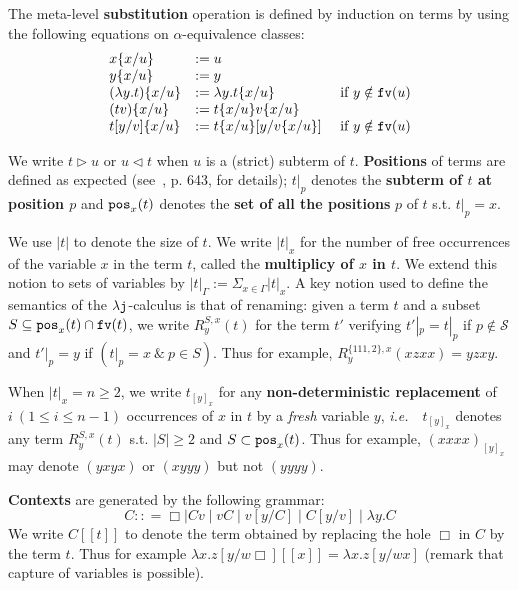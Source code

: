 \documentclass{LMCS}
\newcommand{\ie}{{\it  i.e.}~}
\renewcommand{\>}{\rightarrow}
\def\lam{\lambda}
\newcommand{\isubs}[1]{ \{ #1  \} }
\newcommand{\pos}[2]{{\tt pos}_{#1}(#2)}
\renewcommand{\S}{\mathcal{S}}
\newcommand{\dis}{{\tt j}}
\newcommand{\ldis}{\lam{\dis}}
\newcommand{\ren}[4]{R^{#2, #3}_{#4}(#1)}
\newcommand{\fv}[1]{{\tt fv}(#1)}
\newcommand{\set}[1]{ \{ #1 \}}
\newcommand{\deft}[1]{{\bf #1}}
\newcommand{\ctx}[2]{#1 [ \! [#2] \! ]}
\newcommand{\subt}{\triangleleft}
\newcommand{\surt}{\triangleright}
\newcommand{\hole}{\Box}
\begin{document}
The meta-level \deft{substitution} operation is defined by
induction on terms by using the following equations on $\alpha$-equivalence classes:
\[ \begin{array}{llll}
x \isubs{x/u} & := u \\
y \isubs{x/u} & := y \\
(\lam y. t) \isubs{x/u} & := \lam y. t \isubs{x/u} & \mbox{ if } y \notin \fv{u}   \\
(tv) \isubs{x/u} & := t \isubs{x/u}v \isubs{x/u}   \\
t[y/v] \isubs{x/u} & := t \isubs{x/u}[y/v \isubs{x/u}] & \mbox{ if } y \notin \fv{u}  \\
\end{array} \] 

We write $t \surt u$ or $u \subt t$ when $u$ is a (strict) subterm of $t$.
\deft{Positions} of terms are defined as expected (see~\cite{Terese03}, p. 643, for details);  $t|_p$ denotes
the \deft{subterm of $t$ at position $p$}
and $\pos{x}{t}$ denotes the \deft{set of all the positions} $p$ of
$t$ s.t. $t|_{p}= x$. 


We use $|t|$ to denote the size of $t$. We write $|t|_x$ for the
number of free occurrences of the variable $x$ in the term $t$,
called the \deft{multiplicy of $x$ in $t$}. We extend this notion to sets of variables by
  $|t|_{\Gamma}:= \Sigma_{x \in \Gamma} |t|_{x}$. 
A key notion used to define the semantics 
of the $\ldis$-calculus is that of renaming:
given a term $t$ and a subset
$S \subseteq \pos{x}{t} \cap \fv{t} $, we write $\ren{t}{S}{x}{y}$ for
the term $t'$ verifying $t'|_p = t|_p$ if $p \notin \S$
and $t'|_p = y$ if $(t|_p =x\ \&\ p \in S)$. Thus for example,
$\ren{x z x x}{\set{111,2}}{x}{y} = y z x y$. 

When $|t|_{x}= n
\geq 2$, we write $t_{[y]_x}$ for any
\deft{non-deterministic replacement} of $i\ ( 1 \leq i \leq n-1)$
occurrences of $x$ in $t$ by a {\it fresh} variable $y$, \ie\
$t_{[y]_x}$ denotes  any term $\ren{t}{S}{x}{y}$ s.t. 
$|S| \geq 2$ and $S \subset \pos{x}{t}$. 
 Thus for
example, $(x x x x)_{[y]_x}$ may denote $(y x y x)$ or
$(x y y y)$ but not $(y y y y)$.

\deft{Contexts} are generated by the following grammar:
\[ C :: = \hole \mid C v \mid v C \mid v[y/C] \mid C[y/v] \mid \lam y. C\]
We write $\ctx{C}{t}$ to denote the term obtained by replacing the
hole $\hole$ in $C$ by the term $t$. Thus for example  
$\ctx{\lam x. z[y/w\hole]}{x} = \lam x. z[y/wx]$ (remark that 
capture of variables is possible).
\end{document}
